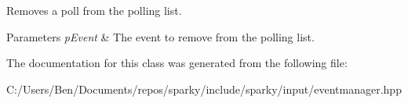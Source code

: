 Removes a poll from the polling list. 


\begin{DoxyParams}{Parameters}
{\em p\+Event} & The event to remove from the polling list. \\
\hline
\end{DoxyParams}


The documentation for this class was generated from the following file\+:\begin{DoxyCompactItemize}
\item 
C\+:/\+Users/\+Ben/\+Documents/repos/sparky/include/sparky/input/eventmanager.\+hpp\end{DoxyCompactItemize}
